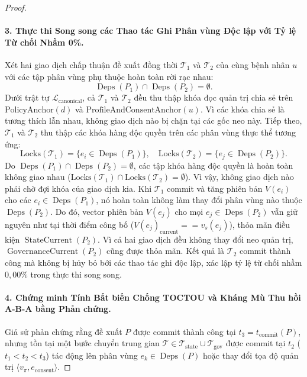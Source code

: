 \documentclass[11pt]{article}
\begin{document}
\begin{proof}
\paragraph{3. Thực thi Song song các Thao tác Ghi Phân vùng Độc lập với Tỷ lệ Từ chối Nhầm 0\%.}
Xét hai giao dịch chấp thuận đề xuất đồng thời $\mathcal{T}_1$ và $\mathcal{T}_2$ của cùng bệnh nhân $u$ với các tập phân vùng phụ thuộc hoàn toàn rời rạc nhau:
\begin{equation*}
\operatorname{Deps}(P_1) \cap \operatorname{Deps}(P_2) = \emptyset.
\end{equation*}
Dưới trật tự $\mathcal{L}_{\text{canonical}}$, cả $\mathcal{T}_1$ và $\mathcal{T}_2$ đều thu thập khóa đọc quản trị chia sẻ trên $\text{PolicyAnchor}(d)$ và $\text{ProfileAndConsentAnchor}(u)$. Vì các khóa chia sẻ là tương thích lẫn nhau, không giao dịch nào bị chặn tại các gốc neo này. Tiếp theo, $\mathcal{T}_1$ và $\mathcal{T}_2$ thu thập các khóa hàng độc quyền trên các phân vùng thực thể tương ứng:
\begin{equation*}
\text{Locks}(\mathcal{T}_1) = \{ e_i \in \operatorname{Deps}(P_1) \}, \quad \text{Locks}(\mathcal{T}_2) = \{ e_j \in \operatorname{Deps}(P_2) \}.
\end{equation*}
Do $\operatorname{Deps}(P_1) \cap \operatorname{Deps}(P_2) = \emptyset$, các tập khóa hàng độc quyền là hoàn toàn không giao nhau ($\text{Locks}(\mathcal{T}_1) \cap \text{Locks}(\mathcal{T}_2) = \emptyset$). Vì vậy, không giao dịch nào phải chờ đợi khóa của giao dịch kia. Khi $\mathcal{T}_1$ commit và tăng phiên bản $V(e_i)$ cho các $e_i \in \operatorname{Deps}(P_1)$, nó hoàn toàn không làm thay đổi phân vùng nào thuộc $\operatorname{Deps}(P_2)$. Do đó, vector phiên bản $V(e_j)$ cho mọi $e_j \in \operatorname{Deps}(P_2)$ vẫn giữ nguyên như tại thời điểm công bố ($V(e_j)_{\text{current}} == v_s(e_j)$), thỏa mãn điều kiện $\operatorname{StateCurrent}(P_2)$. Vì cả hai giao dịch đều không thay đổi neo quản trị, $\operatorname{GovernanceCurrent}(P_2)$ cũng được thỏa mãn. Kết quả là $\mathcal{T}_2$ commit thành công mà không bị hủy bỏ bởi các thao tác ghi độc lập, xác lập tỷ lệ từ chối nhầm $0{,}00\%$ trong thực thi song song.

\paragraph{4. Chứng minh Tính Bất biến Chống TOCTOU và Kháng Mù Thu hồi A-B-A bằng Phản chứng.}
Giả sử phản chứng rằng đề xuất $P$ được commit thành công tại $t_3 = t_{\text{commit}}(P)$, nhưng tồn tại một bước chuyển trung gian $\mathcal{T} \in \mathcal{T}_{\text{state}} \cup \mathcal{T}_{\text{gov}}$ được commit tại $t_2$ ($t_1 < t_2 < t_3$) tác động lên phân vùng $e_k \in \operatorname{Deps}(P)$ hoặc thay đổi tọa độ quản trị $\langle v_{\pi}, e_{\text{consent}} \rangle$.


\end{proof}
\end{document}
